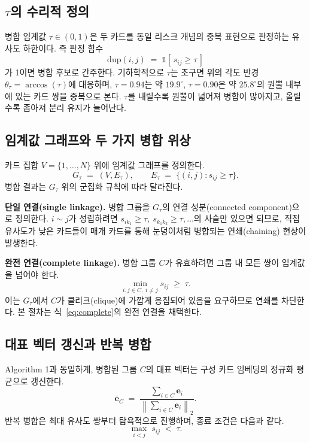 \documentclass[11pt,a4paper]{article}
\begin{document}
\subsection{$\tau$의 수리적 정의}

병합 임계값 $\tau \in (0,1)$은 두 카드를 동일 리스크 개념의 중복 표현으로 판정하는 유사도 하한이다. 즉 판정 함수
\begin{equation}
\mathrm{dup}(i,j) \;=\; \mathbb{1}\!\left[\, s_{ij} \geq \tau \,\right]
\end{equation}
가 1이면 병합 후보로 간주한다. 기하학적으로 $\tau$는 초구면 위의 각도 반경 $\theta_\tau = \arccos(\tau)$에 대응하며, $\tau=0.94$는 약 $19.9^\circ$, $\tau=0.90$은 약 $25.8^\circ$의 원뿔 내부에 있는 카드 쌍을 중복으로 본다. $\tau$를 내릴수록 원뿔이 넓어져 병합이 많아지고, 올릴수록 좁아져 분리 유지가 늘어난다.

\subsection{임계값 그래프와 두 가지 병합 위상}

카드 집합 $V=\{1,\dots,N\}$ 위에 임계값 그래프를 정의한다.
\begin{equation}
G_\tau \;=\; (V, E_\tau), \qquad E_\tau \;=\; \{(i,j) : s_{ij} \geq \tau\}.
\end{equation}
병합 결과는 $G_\tau$ 위의 군집화 규칙에 따라 달라진다.

\textbf{단일 연결(single linkage).} 병합 그룹을 $G_\tau$의 연결 성분(connected component)으로 정의한다. $i \sim j$가 성립하려면 $s_{ik_1} \geq \tau,\ s_{k_1 k_2} \geq \tau, \dots$의 사슬만 있으면 되므로, 직접 유사도가 낮은 카드들이 매개 카드를 통해 눈덩이처럼 병합되는 연쇄(chaining) 현상이 발생한다.

\textbf{완전 연결(complete linkage).} 병합 그룹 $C$가 유효하려면 그룹 내 모든 쌍이 임계값을 넘어야 한다.
\begin{equation}
\min_{i,j \in C,\; i \neq j} s_{ij} \;\geq\; \tau .
\label{eq:complete}
\end{equation}
이는 $G_\tau$에서 $C$가 클리크(clique)에 가깝게 응집되어 있음을 요구하므로 연쇄를 차단한다. 본 절차는 식~\eqref{eq:complete}의 완전 연결을 채택한다.

\subsection{대표 벡터 갱신과 반복 병합}

Algorithm 1과 동일하게, 병합된 그룹 $C$의 대표 벡터는 구성 카드 임베딩의 정규화 평균으로 갱신한다.
\begin{equation}
\bar{\mathbf{e}}_C \;=\; \frac{\sum_{i \in C} \mathbf{e}_i}{\left\lVert \sum_{i \in C} \mathbf{e}_i \right\rVert_2}.
\end{equation}
반복 병합은 최대 유사도 쌍부터 탐욕적으로 진행하며, 종료 조건은 다음과 같다.
\begin{equation}
\max_{i<j} \; s_{ij} \;<\; \tau .
\end{equation}
\end{document}
